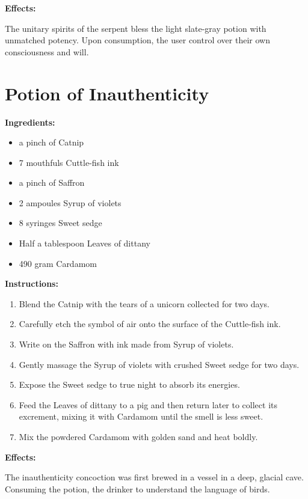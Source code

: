 \documentclass{article}
\begin{document}
\textbf{Effects:}

The unitary spirits of the serpent bless the light slate-gray potion with unmatched potency. Upon consumption, the user control over their own consciousness and will.

\newpage
\section*{Potion of Inauthenticity}

\textbf{Ingredients:}

\begin{itemize}
  \item a pinch of Catnip
  \item 7 mouthfuls Cuttle-fish ink
  \item a pinch of Saffron
  \item 2 ampoules Syrup of violets
  \item 8 syringes Sweet sedge
  \item Half a tablespoon Leaves of dittany
  \item 490 gram Cardamom
\end{itemize}

\textbf{Instructions:}

\begin{enumerate}
  \item Blend the Catnip with the tears of a unicorn collected for two days.
  \item Carefully etch the symbol of air onto the surface of the Cuttle-fish ink.
  \item Write on the Saffron with ink made from Syrup of violets.
  \item Gently massage the Syrup of violets with crushed Sweet sedge for two days.
  \item Expose the Sweet sedge to true night to absorb its energies.
  \item Feed the Leaves of dittany to a pig and then return later to collect its excrement, mixing it with Cardamom until the smell is less sweet.
  \item Mix the powdered Cardamom with golden sand and heat boldly.
\end{enumerate}

\textbf{Effects:}

The inauthenticity concoction was first brewed in a vessel in a deep, glacial cave. Consuming the potion, the drinker to understand the language of birds.
\end{document}
